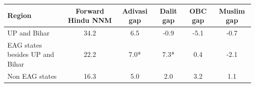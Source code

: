 \begin{tabular}{lccccc}
\hline
Region & Forward Hindu NNM & Adivasi gap & Dalit gap & OBC gap & Muslim gap \\
\hline
UP and Bihar&34.2&6.5&-0.9&-5.1&-0.7\\
EAG states besides UP and Bihar&22.2&7.0*&7.3*&0.4&-2.1\\
Non EAG states&16.3&5.0&2.0&3.2&1.1\\
\hline
\end{tabular}
